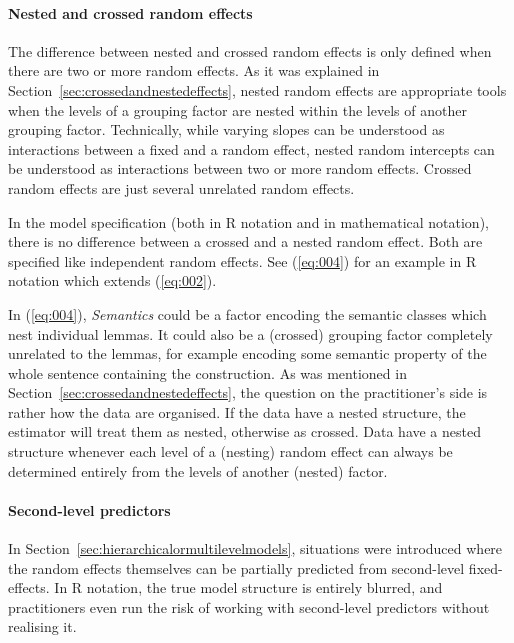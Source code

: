 \paragraph{Nested and crossed random effects}

The difference between nested and crossed random effects is only defined when there are two or more random effects.
As it was explained in Section~\ref{sec:crossedandnestedeffects}, nested random effects are appropriate tools when the levels of a grouping factor are nested within the levels of another grouping factor.
Technically, while varying slopes can be understood as interactions between a fixed and a random effect, nested random intercepts can be understood as interactions between two or more random effects.
Crossed random effects are just several unrelated random effects.

In the model specification (both in R notation and in mathematical notation), there is no difference between a crossed and a nested random effect.
Both are specified like independent random effects.
See (\ref{eq:004}) for an example in R notation which extends (\ref{eq:002}).


In (\ref{eq:004}), \textit{Semantics} could be a factor encoding the semantic classes which nest individual lemmas.
It could also be a (crossed) grouping factor completely unrelated to the lemmas, for example encoding some semantic property of the whole sentence containing the construction.
As was mentioned in Section~\ref{sec:crossedandnestedeffects}, the question on the practitioner's side is rather how the data are organised.
If the data have a nested structure, the estimator will treat them as nested, otherwise as crossed.
Data have a nested structure whenever each level of a (nesting) random effect can always be determined entirely from the levels of another (nested) factor.


\paragraph{Second-level predictors}

In Section~\ref{sec:hierarchicalormultilevelmodels}, situations were introduced where the random effects themselves can be partially predicted from second-level fixed-effects.
In R notation, the true model structure is entirely blurred, and practitioners even run the risk of working with second-level predictors without realising it.

